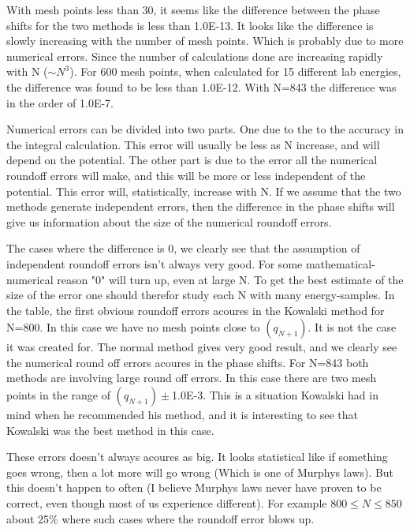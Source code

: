 With mesh points less than 30, it seems like the difference between the phase shifts for the two methods
is less than 1.0E-13. It looks like the difference is slowly increasing with the number of mesh points. Which
is probably due to more numerical errors. Since the number of calculations done are increasing rapidly with N ($\sim N^3$). 
For 600 mesh points, when calculated for 15 different lab energies, the difference was found to be less than 1.0E-12. 
With N=843 the difference was in the order of 1.0E-7. 

Numerical errors can be divided into two parts. One due to the
to the accuracy in the integral calculation. This error will usually be less as N increase, and will depend on the potential.
The other part is due to the error all the numerical roundoff
errors will make, and this will be more or less independent of the potential. This error will, statistically, increase with N.
If we assume that the two methods generate independent errors, then the difference in the phase shifts will give us information
about the size of the numerical roundoff errors. 

The cases where the difference is 0, we clearly see that the assumption of independent roundoff errors
isn't always very good. For some mathematical-numerical reason "0" will turn up, even at large N.
To get the best estimate of the size of the error one should therefor study
each N with many energy-samples.
In the table, the first obvious roundoff errors acoures in the Kowalski method for N=800. In this case
we have no mesh points close to $(q_{N+1})$. It is not the case it was created for. The normal method
gives very good result, and we clearly see the numerical round off errors acoures in the phase shifts. 
For N=843 both methods are involving
large round off errors. In this case there are two mesh points in the range of $(q_{N+1})\pm$1.0E-3. This is a situation
Kowalski had in mind when he recommended his method, and it is interesting to see that Kowalski was the best method in this case.

These errors doesn't
always acoures as big. It looks statistical like if something goes wrong, then a lot more will go wrong 
(Which is one of Murphys laws). 
But this doesn't happen to often (I believe Murphys laws never have proven to be correct, even though most of us experience different). 
For example $800\le N\le 850$ about 25$\%$ where such cases where the roundoff error blows up.

